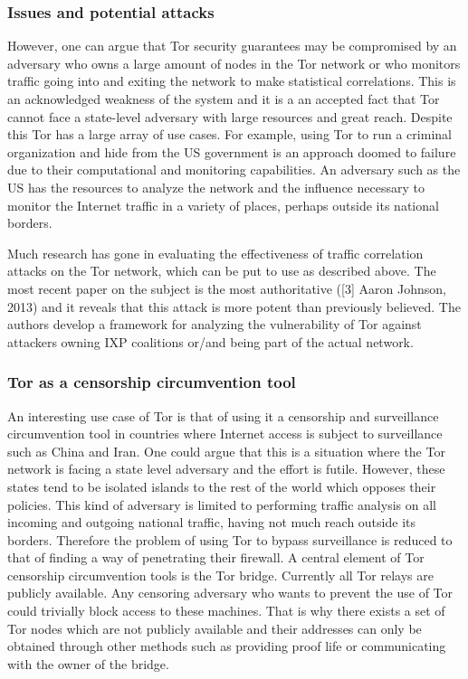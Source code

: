 \documentclass[11pt]{article} %
\begin{document}
\subsubsection{Issues and potential attacks}

However, one can argue that Tor security guarantees may be compromised by an adversary who owns a large amount of nodes in the Tor network or who monitors traffic going into and exiting the network to make statistical correlations. This is an acknowledged weakness of the system and it is a an accepted fact that Tor cannot face a state-level adversary with large resources and great reach. Despite this Tor has a large array of use cases. For example, using Tor to run a criminal organization and hide from the US government is an approach doomed to failure due to their computational and monitoring capabilities. An adversary such as the US has the resources to analyze the network and the influence necessary to monitor the Internet traffic in a variety of places, perhaps outside its national borders.

Much research has gone in evaluating the effectiveness of traffic correlation attacks on the Tor network, which can be put to use as described above. The most recent paper on the subject is the most authoritative ([3] Aaron Johnson, 2013) and it reveals that this attack is more potent than previously believed. The authors develop a framework for analyzing the vulnerability of Tor against attackers owning IXP coalitions or/and being part of the actual network.

\subsubsection{Tor as a censorship circumvention tool}

An interesting use case of Tor is that of using it a censorship and surveillance circumvention tool in countries where Internet access is subject to surveillance such as China and Iran. One could argue that this is a situation where the Tor network is facing a state level adversary and the effort is futile. However, these states tend to be isolated islands to the rest of the world which opposes their policies. This kind of adversary is limited to performing traffic analysis on all incoming and outgoing national traffic, having not much reach outside its borders. Therefore the problem of using Tor to bypass surveillance is reduced to that of finding a way of penetrating their firewall.
A central element of Tor censorship circumvention tools is the Tor bridge. Currently all Tor relays are publicly available. Any censoring adversary who wants to prevent the use of Tor could trivially block access to these machines. That is why there exists a set of Tor nodes which are not publicly available and their addresses can only be obtained through other methods such as providing proof life or communicating with the owner of the bridge. 
\end{document}
